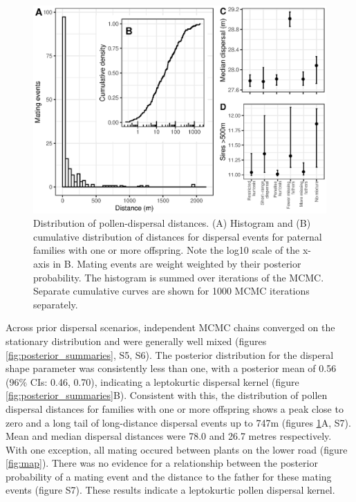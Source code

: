 \documentclass[10pt, a4paper, twocolumn]{article} %
\begin{document}
\begin{figure}
    \centering
    \includegraphics{dispersal.eps}
    \caption{
        Distribution of pollen-dispersal distances.
        (A) Histogram and (B) cumulative distribution of distances for dispersal events for paternal families with one or more offspring.
        Note the log10 scale of the x-axis in B.
        Mating events are weight weighted by their posterior probability.
        The histogram is summed over iterations of the MCMC.
        Separate cumulative curves are shown for 1000 MCMC iterations separately.
    }
    \label{fig:dispersal}
\end{figure}

Across prior dispersal scenarios, independent MCMC chains converged on the stationary distribution and were generally well mixed (figures \ref{fig:posterior_summaries}, S5, S6).
The posterior distribution for the disperal shape parameter was consistently less than one, with a posterior mean of 0.56 (96\% CIs: 0.46, 0.70), indicating a leptokurtic dispersal kernel (figure \ref{fig:posterior_summaries}B).
Consistent with this, the distribution of pollen dispersal distances for families with one or more offspring shows a peak close to zero and a long tail of long-distance dispersal events up to 747m (figures \ref{fig:dispersal}A, S7).
Mean and median dispersal distances were 78.0 and 26.7 metres respectively.
With one exception, all mating occured between plants on the lower road (figure \ref{fig:map}).
There was no evidence for a relationship between the posterior probability of a mating event and the distance to the father for these mating events (figure S7).
These results indicate a leptokurtic pollen dispersal kernel.
\end{document}
